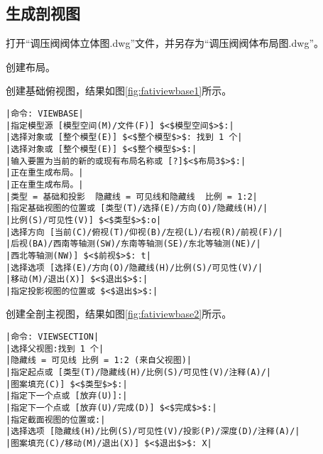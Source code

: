 \subsection{生成剖视图}
\begin{procedure}
\item 打开“调压阀阀体立体图.dwg”文件，并另存为“调压阀阀体布局图.dwg”。
\item 创建布局。
\item 创建基础俯视图，结果如图\ref{fig:fativiewbase1}所示。
\begin{figure}[htbp]
\centering
\begin{floatrow}[2]
\end{floatrow}
\end{figure}
\begin{lstlisting}
|命令: VIEWBASE|
|指定模型源 [模型空间(M)/文件(F)] $<$模型空间$>$:|
|选择对象或 [整个模型(E)] $<$整个模型$>$: 找到 1 个|
|选择对象或 [整个模型(E)] $<$整个模型$>$:|
|输入要置为当前的新的或现有布局名称或 [?]$<$布局3$>$:|
|正在重生成布局。|
|正在重生成布局。|
|类型 = 基础和投影  隐藏线 = 可见线和隐藏线  比例 = 1:2|
|指定基础视图的位置或 [类型(T)/选择(E)/方向(O)/隐藏线(H)/|
|比例(S)/可见性(V)] $<$类型$>$:o|
|选择方向 [当前(C)/俯视(T)/仰视(B)/左视(L)/右视(R)/前视(F)/|
|后视(BA)/西南等轴测(SW)/东南等轴测(SE)/东北等轴测(NE)/|
|西北等轴测(NW)] $<$前视$>$: t|
|选择选项 [选择(E)/方向(O)/隐藏线(H)/比例(S)/可见性(V)/|
|移动(M)/退出(X)] $<$退出$>$:|
|指定投影视图的位置或 $<$退出$>$:|
\end{lstlisting}
\item 创建全剖主视图，结果如图\ref{fig:fativiewbase2}所示。
\begin{lstlisting}
|命令: VIEWSECTION|
|选择父视图:找到 1 个|
|隐藏线 = 可见线 比例 = 1:2 (来自父视图)|
|指定起点或 [类型(T)/隐藏线(H)/比例(S)/可见性(V)/注释(A)/|
|图案填充(C)] $<$类型$>$:|
|指定下一个点或 [放弃(U)]:|
|指定下一个点或 [放弃(U)/完成(D)] $<$完成$>$:|
|指定截面视图的位置或:|
|选择选项 [隐藏线(H)/比例(S)/可见性(V)/投影(P)/深度(D)/注释(A)/|
|图案填充(C)/移动(M)/退出(X)] $<$退出$>$: X|
\end{lstlisting}


\end{procedure}
